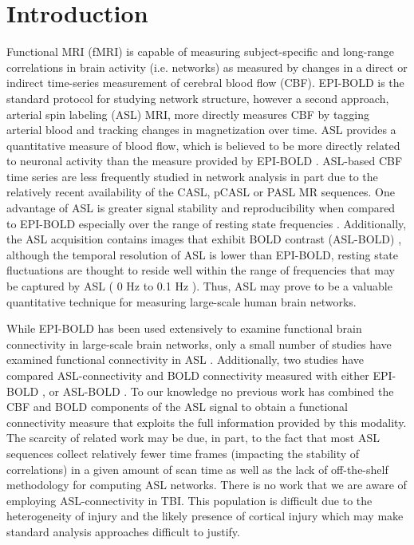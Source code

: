 \documentclass{llncs}
\begin{document}
\section{Introduction}
Functional MRI (fMRI) is capable of measuring subject-specific and long-range correlations in brain activity (i.e. networks) as measured by changes in a direct or indirect time-series measurement of cerebral blood flow (CBF).  EPI-BOLD is the standard protocol for studying network structure, however a second approach, arterial spin labeling (ASL) MRI, more directly measures CBF by tagging arterial blood and tracking changes in magnetization over time. ASL provides a quantitative measure of blood flow, which is believed to be more directly related to neuronal activity than the measure provided by EPI-BOLD \cite{Wong1997}.  ASL-based CBF time series are less frequently studied in network analysis in part due to the relatively recent availability of the CASL, pCASL or PASL MR sequences.  One advantage of ASL is greater signal stability and reproducibility when compared to EPI-BOLD especially over the range of resting state frequencies \cite{Aguirre2002}.  Additionally, the ASL acquisition contains images that exhibit BOLD contrast (ASL-BOLD) \cite{Wong1997}, although the temporal resolution of ASL is lower than EPI-BOLD, resting state fluctuations are thought to reside well within the range of frequencies that may be captured by ASL ( 0 Hz to 0.1 Hz ).  Thus, ASL may prove to be a valuable quantitative technique for measuring large-scale human brain networks.


While EPI-BOLD has been used extensively to examine functional brain connectivity in large-scale brain networks, only a small number of studies have examined functional connectivity in ASL \cite{Chuang2008,Zou2009}. Additionally, two studies have compared ASL-connectivity and BOLD connectivity measured with either EPI-BOLD \cite{Li2012}, or ASL-BOLD \cite{Viviani2011}.  To our knowledge no previous work has combined the CBF and BOLD components of the ASL signal to obtain a functional connectivity measure that exploits the full information provided by this modality. The scarcity of related work may be due, in part, to the fact that most ASL sequences collect relatively fewer time frames (impacting the stability of correlations) in a given amount of scan time as well as the lack of off-the-shelf methodology for computing ASL networks.  There is no work that we are aware of employing ASL-connectivity in TBI.   This population is difficult due to the heterogeneity of injury and the likely presence of cortical injury which may make standard analysis approaches difficult to justify. 
\end{document}
